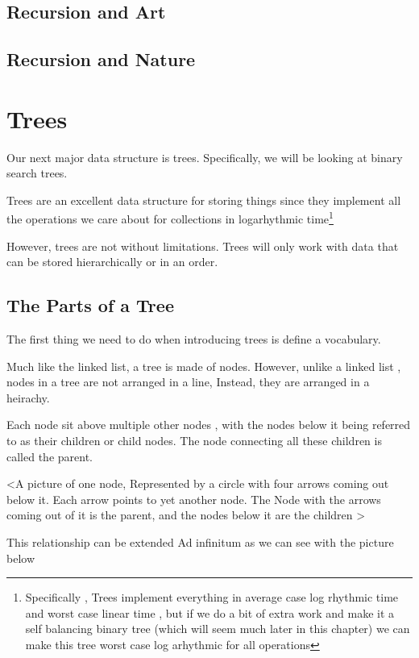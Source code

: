 \documentclass[10pt,a4paper]{book}
\begin{document}
\section{Recursion and Art}

\section{Recursion and Nature}


\chapter{Trees}


Our next major data structure is trees.  Specifically, we will be looking at binary search trees.

Trees are an excellent data structure for storing things since they implement all the operations we care about for collections in logarhythmic time\footnote{Specifically , Trees implement everything in average case log rhythmic time and worst case linear time , but if we do a bit of extra work and make it a self balancing binary tree (which will seem much later in this chapter) we can make this tree worst case log arhythmic for all operations}


However, trees are not without limitations.  Trees will only work with data that can be stored hierarchically or in an order.

\section{The Parts of a Tree}

The first thing we need to do when introducing trees is define a vocabulary.  

Much like the linked list, a tree is made of nodes.
However, unlike a linked list , nodes in a tree are not arranged in a line,
Instead, they are arranged in a heirachy.

Each node sit above multiple other nodes , with the nodes below it being referred to as their children or child nodes.  The node connecting all these children is called the parent.

<A picture of one node, Represented by a circle with four arrows coming out below it. Each arrow points to yet another node.  The Node with the arrows coming out of it is the parent, and the nodes below it are the children >


This relationship can be extended Ad infinitum as we can see with the picture below 
\end{document}
